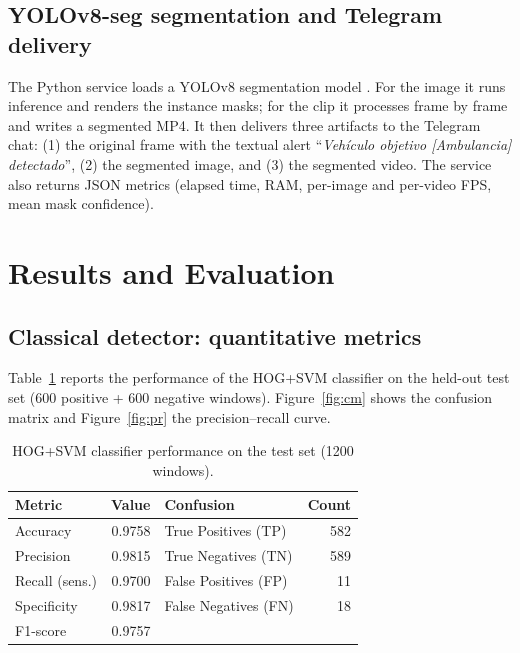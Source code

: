 \documentclass[12pt, a4paper]{article}
\begin{document}
\subsection{YOLOv8-seg segmentation and Telegram delivery}
The Python service loads a YOLOv8 segmentation model \cite{jocher2023yolov8}. For the image
it runs inference and renders the instance masks; for the clip it processes frame by frame
and writes a segmented MP4. It then delivers three artifacts to the Telegram chat: (1) the
original frame with the textual alert ``\emph{Vehículo objetivo [Ambulancia] detectado}'',
(2) the segmented image, and (3) the segmented video. The service also returns JSON metrics
(elapsed time, RAM, per-image and per-video FPS, mean mask confidence).

\section{Results and Evaluation}
\label{sec:results}

\subsection{Classical detector: quantitative metrics}
Table~\ref{tab:metrics} reports the performance of the HOG+SVM classifier on the held-out
test set ($600$ positive + $600$ negative windows). Figure~\ref{fig:cm} shows the confusion
matrix and Figure~\ref{fig:pr} the precision--recall curve.

\begin{table}[htbp]
\centering
\caption{HOG+SVM classifier performance on the test set (1200 windows).}
\label{tab:metrics}
\begin{tabular}{l r l r}
\toprule
\textbf{Metric} & \textbf{Value} & \textbf{Confusion} & \textbf{Count} \\
\midrule
Accuracy     & 0.9758 & True Positives (TP)  & 582 \\
Precision    & 0.9815 & True Negatives (TN)  & 589 \\
Recall (sens.) & 0.9700 & False Positives (FP) & 11 \\
Specificity  & 0.9817 & False Negatives (FN) & 18 \\
F1-score     & 0.9757 & &  \\
\bottomrule
\end{tabular}
\end{table}
\end{document}
